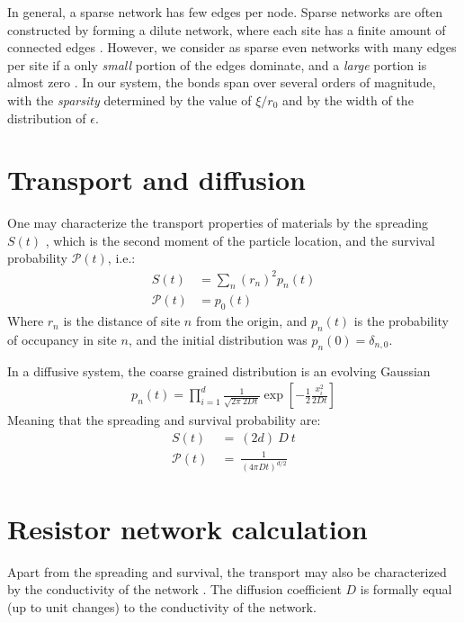 In general, a sparse network has few edges per node. Sparse networks 
are often constructed by forming a dilute network, where each site
has a finite amount of connected edges 
\cite{rodgers_density_1988,biroli_single_1999,fortin_asymptotic_2005,metz_localization_2010}.
However, we consider as sparse even networks with many edges per site
if a only \emph{small} portion of the edges dominate, and a \emph{large}
portion is almost zero \cite{cohen_energy_2012,stotland_semilinear_2009}. In our system, the bonds span
over several orders of magnitude, with the \emph{sparsity} 
determined by the value of $\xi/r_0$ and by the width of the distribution
of $\epsilon$.




\section{Transport and diffusion}

One may characterize the transport properties of materials 
by the spreading $S(t)$ , which is the second moment of 
the particle location, and the survival probability $\mathcal{P}(t)$, i.e.:
%
\begin{align}
S(t) &= \sum_n (r_n)^2 p_n(t) \\
\mathcal{P}(t) &= p_0(t)
\end{align}
%
Where $r_n$ is the distance of site $n$ from the origin,
and $p_n(t)$ is the probability of occupancy in site $n$, and
the initial distribution was $p_n(0) = \delta_{n,0}$.


In a diffusive system, the coarse grained distribution is an evolving Gaussian
%
\begin{align}
p_n(t) = \prod_{i=1}^d \frac{1}{\sqrt{2\pi\ 2Dt}} \exp\left[-\frac{1}{2}\frac{x_i^2}{2Dt}\right]
\end{align}
%
Meaning that the spreading and survival probability are:
%
\begin{align}
S(t) \ &=\ (2d)\ D\ t \\
\mathcal{P}(t)\ &=\ \frac{1}{(4\pi D t)^{d/2}}
\end{align}
%


\section{Resistor network calculation}

Apart from the spreading and survival, the transport may
also be characterized by the conductivity of the network
\cite{halperin_remarks_1989,miller_impurity_1960,ambegaokar_hopping_1971,pollak_percolation_1972,
Aharony_effective_1991,stotland_random-matrix_2010,stotland_semilinear_2009}.
The diffusion coefficient $D$ is formally equal (up to unit
changes) to the conductivity of the network.


